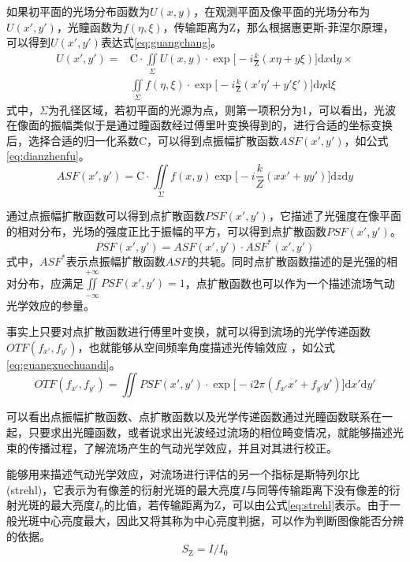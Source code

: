 如果初平面的光场分布函数为$U(x,y)$，在观测平面及像平面的光场分布为$U(x',y')$，光瞳函数为$f(\eta,\xi)$，传输距离为Z，那么根据惠更斯-菲涅尔原理，可以得到$U(x',y')$表达式\eqref{eq:guangchang}。
\begin{equation}
\begin{aligned}
U(x',y')=&\text{C}\cdot\iint\limits_\Sigma U(x,y)\cdot\exp\Big[-i\frac{k}{\text{Z}}(x\eta+y\xi)\Big]\text{d}x\text{d}y\times\\
&\iint\limits_\Sigma f(\eta,\xi)\cdot\exp\Big[-i\frac{k}{\text{Z}}(x'\eta'+y'\xi')\Big]\text{d}\eta\text{d}\xi
\end{aligned}
\label{eq:guangchang}
\end{equation}
式中，$\Sigma$为孔径区域，若初平面的光源为点，则第一项积分为1，可以看出，光波在像面的振幅类似于是通过瞳函数经过傅里叶变换得到的，进行合适的坐标变换后，选择合适的归一化系数C，可以得到点振幅扩散函数$ASF(x',y')$，如公式\eqref{eq:dianzhenfu}。
\begin{equation}
ASF(x',y')=\text{C}\cdot\iint\limits_\Sigma f(x,y)\exp\Big[-i\frac{k}{Z}(xx'+yy')\Big]\text{d}z\text{d}y
\label{eq:dianzhenfu}
\end{equation}

通过点振幅扩散函数可以得到点扩散函数$PSF(x',y')$，它描述了光强度在像平面的相对分布，光场的强度正比于振幅的平方，可以得到点扩散函数$PSF(x',y')$。
\begin{equation}
PSF(x',y')=ASF(x',y')\cdot ASF^*(x',y')
\label{eq:diankuosan}
\end{equation}
式中，$ASF^*$表示点振幅扩散函数$ASF$的共轭。同时点扩散函数描述的是光强的相对分布，应满足$\iint\limits_{-\infty}^{+\infty}PSF(x',y')=1$，点扩散函数也可以作为一个描述流场气动光学效应的参量。

事实上只要对点扩散函数进行傅里叶变换，就可以得到流场的光学传递函数$OTF(f_{x'},f_{y'})$，也就能够从空间频率角度描述光传输效应
，如公式\eqref{eq:guangxuechuandi}。
\begin{equation}
OTF(f_{x'},f_{y'})=\iint PSF(x',y')\cdot\exp\big[-i2\pi(f_{x'}x'+f_{y'}y')\big]\text{d}x'\text{d}y'
\label{eq:guangxuechuandi}
\end{equation}

可以看出点振幅扩散函数、点扩散函数以及光学传递函数通过光瞳函数联系在一起，只要求出光瞳函数，或者说求出光波经过流场的相位畸变情况，就能够描述光束的传播过程，了解流场产生的气动光学效应，并且对其进行校正。

能够用来描述气动光学效应，对流场进行评估的另一个指标是斯特列尔比(strehl)，它表示为有像差的衍射光斑的最大亮度$I$与同等传输距离下没有像差的衍射光斑的最大亮度$I_0$的比值\cite{mark2013}，若传输距离为Z，可以由公式\eqref{eq:strehl}表示。由于一般光斑中心亮度最大，因此又将其称为中心亮度判据，可以作为判断图像能否分辨的依据。
\begin{equation}
S_\text{Z}=I/I_0
\label{eq:strehl}
\end{equation}

